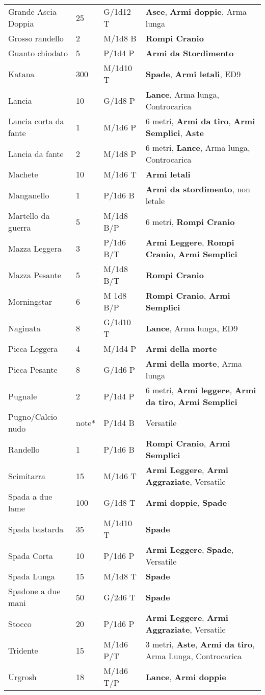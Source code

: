 \documentclass[a4paper,12 pt,openany]{book}
\begin{document}
\begin{textblock*}{19.5cm}
\begin{tabularx}{0.95\textwidth}{llll}
Grande Ascia Doppia& 25 & G/1d12 T& \textbf{Asce}, \textbf{Armi doppie}, Arma lunga\\
Grosso randello& 2& M/1d8 B&\textbf{Rompi Cranio}\\
Guanto chiodato& 5& P/1d4 P&\textbf{Armi da Stordimento}\\
Katana& 300& M/1d10 T& \textbf{Spade}, \textbf{Armi letali}, ED9\\
Lancia& 10 & G/1d8 P&\textbf{Lance}, Arma lunga, Controcarica\\
Lancia corta da fante& 1& M/1d6 P& 6 metri, \textbf{Armi da tiro}, \textbf{Armi Semplici}, \textbf{Aste}\\
Lancia da fante& 2& M/1d8 P&6 metri, \textbf{Lance}, Arma lunga, Controcarica\\
Machete& 10 & M/1d6 T&\textbf{Armi letali}\\
Manganello& 1& P/1d6 B& \textbf{Armi da stordimento}, non letale\\
Martello da guerra& 5& M/1d8 B/P& 6 metri, \textbf{Rompi Cranio}\\
Mazza Leggera& 3& P/1d6 B/T& \textbf{Armi Leggere}, \textbf{Rompi Cranio}, \textbf{Armi Semplici}\\
Mazza Pesante& 5& M/1d8 B/T& \textbf{Rompi Cranio}\\
Morningstar& 6& M 1d8 B/P&\textbf{Rompi Cranio},\textbf{ Armi Semplici}\\
Naginata& 8& G/1d10 T&\textbf{Lance}, Arma lunga, ED9\\
Picca Leggera& 4& M/1d4 P&\textbf{Armi della morte}\\
Picca Pesante& 8& G/1d6 P&\textbf{Armi della morte}, Arma lunga\\
Pugnale& 2& P/1d4 P& 6 metri, \textbf{Armi leggere}, \textbf{Armi da tiro}, \textbf{Armi Semplici}\\
Pugno/Calcio nudo& note*& P/1d4 B&Versatile\\
Randello& 1& P/1d6 B&\textbf{Rompi Cranio}, \textbf{Armi Semplici}\\
Scimitarra& 15 & M/1d6 T&\textbf{Armi Leggere}, \textbf{Armi Aggraziate}, Versatile\\
Spada a due lame& 100& G/1d8 T& \textbf{Armi doppie}, \textbf{Spade}\\
Spada bastarda& 35 & M/1d10 T&\textbf{Spade}\\
Spada Corta& 10 & P/1d6 P&\textbf{Armi Leggere}, \textbf{Spade}, Versatile\\
Spada Lunga& 15 & M/1d8 T&\textbf{Spade}\\
Spadone a due mani& 50 & G/2d6 T&\textbf{Spade}\\
Stocco& 20 & P/1d6 P& \textbf{Armi Leggere}, \textbf{Armi Aggraziate}, Versatile\\
Tridente& 15 & M/1d6 P/T& 3 metri, \textbf{Aste}, \textbf{Armi da tiro}, Arma Lunga, Controcarica\\
Urgrosh& 18 & M/1d6 T/P& \textbf{Lance}, \textbf{Armi doppie}\\
\end{tabularx}

\end{textblock*}
\end{document}
